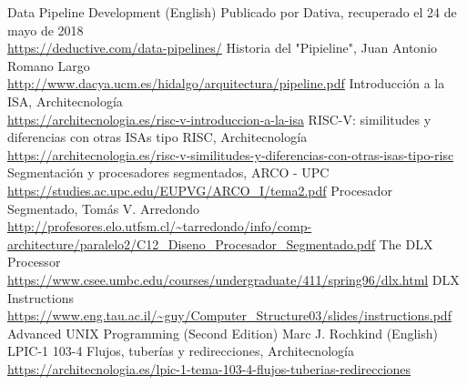\documentclass[a4paper, 11pt, titlepage]{article}
\begin{document}
\newpage
\begin{thebibliography}{X}
    \bibitem{} Data Pipeline Development (English) Publicado por Dativa, recuperado el 24 de mayo de 2018 \\ \url{https://deductive.com/data-pipelines/}
    \bibitem{} Historia del "Pipieline", Juan Antonio Romano Largo \\ \url{http://www.dacya.ucm.es/hidalgo/arquitectura/pipeline.pdf}
    \bibitem{} Introducción a la ISA, Architecnología \\ \url{https://architecnologia.es/risc-v-introduccion-a-la-isa}
    \bibitem{} RISC-V: similitudes y diferencias con otras ISAs tipo RISC, Architecnología \\ \footnotesize \url{https://architecnologia.es/risc-v-similitudes-y-diferencias-con-otras-isas-tipo-risc}
    \bibitem{} Segmentación y procesadores segmentados, ARCO - UPC \\ \url{https://studies.ac.upc.edu/EUPVG/ARCO_I/tema2.pdf}
    \bibitem{} Procesador Segmentado, Tomás V. Arredondo \\ \url{http://profesores.elo.utfsm.cl/~tarredondo/info/comp-architecture/paralelo2/C12_Diseno_Procesador_Segmentado.pdf}
    \bibitem{} The DLX Processor \\ \url{https://www.csee.umbc.edu/courses/undergraduate/411/spring96/dlx.html}
    \bibitem{} DLX Instructions \\ \url{https://www.eng.tau.ac.il/~guy/Computer_Structure03/slides/instructions.pdf}
    \bibitem{} Advanced UNIX Programming (Second Edition) Marc J. Rochkind (English)
    \bibitem{} LPIC-1 103-4 Flujos, tuberías y redirecciones, Architecnología \\ \url{https://architecnologia.es/lpic-1-tema-103-4-flujos-tuberias-redirecciones}
\end{thebibliography}
\end{document}
